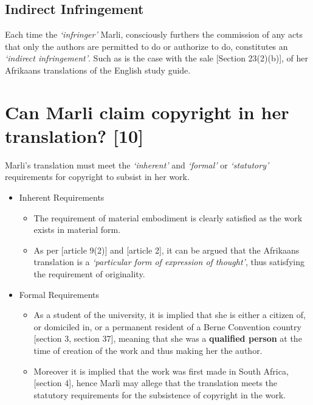 \documentclass[11pt]{article}
\begin{document}
\subsection{Indirect Infringement}
\label{sec:orgf4ea1d7}

Each time the \emph{`infringer'} Marli, consciously furthers the commission
of any acts that only the authors are permitted to do or authorize to
do, constitutes an \emph{`indirect infringement'}. Such as is the case with
the sale [Section 23(2)(b)]\cite{rsa78_copyrightact}, of her Afrikaans
translations of the English study guide.

\section{Can Marli claim copyright in her translation? \textbf{[10]}}
\label{sec:org8d1ac66}

Marli's translation must meet the \emph{`inherent'} and \emph{`formal'} or
\emph{`statutory'} requirements for copyright to subsist in her work.
\begin{itemize}
\item Inherent Requirements
\begin{itemize}
\item The requirement of material embodiment is clearly satisfied as the
work exists in material form.
\item As per [article 9(2)]\cite{wto17_trips} and
[article 2]\cite{wipo96_copyright_treaty}, it can be argued that the
Afrikaans translation is a \emph{`particular form of expression of
thought'}, thus satisfying the requirement of originality.
\end{itemize}
\item Formal Requirements
\begin{itemize}
\item As a student of the university, it is implied that she is either a
citizen of, or domiciled in, or a permanent resident of a Berne
Convention country [section 3, section 37]\cite{wipo86_berne},
meaning that she was a \textbf{qualified person} at the time of creation
of the work and thus making her the author.
\item Moreover it is implied that the work was first made in South
Africa, [section 4]\cite{rsa78_copyrightact}, hence Marli may allege
that the translation meets the statutory requirements for the
subsistence of copyright in the work.
\end{itemize}
\end{itemize}
\end{document}
